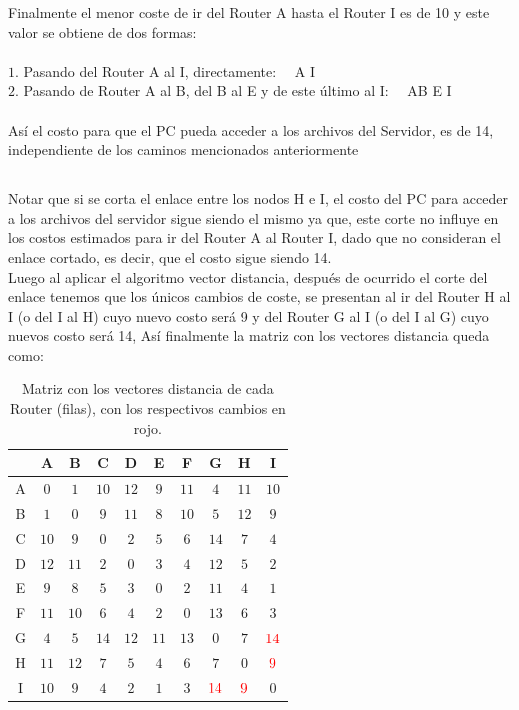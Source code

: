 \documentclass[a4paper,10pt]{article}
\begin{document}
Finalmente el menor coste de ir del Router A hasta el Router I es de 10 y este valor se obtiene de dos formas:\\ \\

$1.$ Pasando del Router A al I, directamente: \ \ A \rightarrow I \\
$2.$ Pasando de Router A al B, del B al E y de este último al I:  \ \ A\rightarrow B \rightarrow E \rightarrow I \\ \\

Así el costo para que el PC pueda acceder a los archivos del Servidor, es de 14, independiente de los caminos mencionados anteriormente

\subsection{}

Notar que si se corta el enlace entre los nodos H e I, el costo del PC para acceder a los archivos del servidor  sigue siendo el mismo ya que, este corte no influye en los costos estimados para ir del Router A al Router I, dado que no consideran el enlace cortado, es decir, que el costo sigue siendo 14. \\

Luego al aplicar el algoritmo vector distancia, después  de ocurrido el corte del enlace tenemos que los únicos cambios de coste, se presentan al ir del Router H al I (o del I al H) cuyo nuevo costo será 9 y del Router G al I (o del I al G) cuyo nuevos costo será 14, Así finalmente la matriz con los vectores distancia  queda como: \\

\begin{table}[H]
\centering
\begin{tabular}{|c|c|c|c|c|c|c|c|c|c|} \hline
    & A & B & C & D & E & F & G & H & I  \\\hline
A & $0 $ & $1 $ & $10 $ & $12 $ & $9 $ & $11 $ & $4 $ & $11 $ & $10$  \\\hline
B & $ 1$ & $0 $ & $ 9$ & $11 $ & $8 $ & $10 $ & $5 $ & $12 $ &  $9$ \\\hline
C & $10 $ & $ 9$ & $ 0$ & $ 2$ & $ 5$ & $ 6$ & $ 14$ & $ 7$ &   $4$\\\hline
D & $ 12$ & $ 11$ & $2 $ & $0 $ & $3 $ & $4 $ & $12 $ & $5 $ &   $2$\\\hline
E & $9 $ & $8 $ & $ 5$ & $ 3$ & $ 0$ & $ 2$ & $ 11$ & $ 4$ &   $1$\\\hline
F & $11 $ & $10 $ & $6 $ & $4 $ & $2 $ & $0 $ & $13 $ & $6 $ &   $3$\\\hline
G & $4 $ & $ 5$ & $ 14$ & $ 12$ & $ 11$ & $13 $ & $ 0$ & $ 7$ &   ${\color{red}14}$\\\hline
H & $ 11$ & $12 $ & $7 $ & $5 $ & $4 $ & $6 $ & $7 $ & $ 0$ &   ${\color{red}9}$\\\hline
I  & $10 $ & $ 9$ & $ 4$ & $2 $ & $ 1$ & $ 3$ & $ {\color{red}14}$ & $ {\color{red}9}$ &   $0$\\\hline
\end{tabular}
\caption{Matriz con los vectores distancia de cada Router (filas), con los respectivos cambios en rojo.}
\end{table} \\
\end{document}
